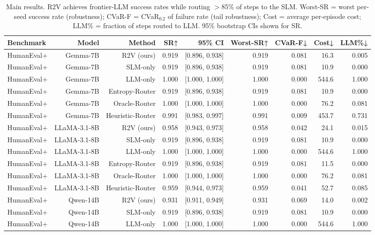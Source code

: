 \begin{table}[t]
\centering
\caption{Main results.  R2V achieves frontier-LLM success rates while routing $>$85\% of steps to the SLM.  Worst-SR = worst per-seed success rate (robustness); CVaR-F = CVaR$_{0.2}$ of failure rate (tail robustness); Cost = average per-episode cost; LLM\% = fraction of steps routed to LLM. 95\% bootstrap CIs shown for SR.}
\label{tab:main-results}
\begin{tabular}{lrrrrrrrr}
\hline
Benchmark & Model & Method & SR↑ & 95\% CI & Worst-SR↑ & CVaR-F↓ & Cost↓ & LLM\%↓ \\
\hline
HumanEval+ & Gemma-7B & R2V (ours) & 0.919 & [0.896, 0.938] & 0.919 & 0.081 & 16.3 & 0.005 \\
HumanEval+ & Gemma-7B & SLM-only & 0.919 & [0.896, 0.938] & 0.919 & 0.081 & 10.9 & 0.000 \\
HumanEval+ & Gemma-7B & LLM-only & 1.000 & [1.000, 1.000] & 1.000 & 0.000 & 544.6 & 1.000 \\
HumanEval+ & Gemma-7B & Entropy-Router & 0.919 & [0.896, 0.938] & 0.919 & 0.081 & 10.9 & 0.000 \\
HumanEval+ & Gemma-7B & Oracle-Router & 1.000 & [1.000, 1.000] & 1.000 & 0.000 & 76.2 & 0.081 \\
HumanEval+ & Gemma-7B & Heuristic-Router & 0.991 & [0.983, 0.997] & 0.991 & 0.009 & 453.7 & 0.731 \\
HumanEval+ & LLaMA-3.1-8B & R2V (ours) & 0.958 & [0.943, 0.973] & 0.958 & 0.042 & 24.1 & 0.015 \\
HumanEval+ & LLaMA-3.1-8B & SLM-only & 0.919 & [0.896, 0.938] & 0.919 & 0.081 & 10.9 & 0.000 \\
HumanEval+ & LLaMA-3.1-8B & LLM-only & 1.000 & [1.000, 1.000] & 1.000 & 0.000 & 544.6 & 1.000 \\
HumanEval+ & LLaMA-3.1-8B & Entropy-Router & 0.919 & [0.896, 0.938] & 0.919 & 0.081 & 11.5 & 0.000 \\
HumanEval+ & LLaMA-3.1-8B & Oracle-Router & 1.000 & [1.000, 1.000] & 1.000 & 0.000 & 76.2 & 0.081 \\
HumanEval+ & LLaMA-3.1-8B & Heuristic-Router & 0.959 & [0.944, 0.973] & 0.959 & 0.041 & 52.7 & 0.085 \\
HumanEval+ & Qwen-14B & R2V (ours) & 0.931 & [0.911, 0.949] & 0.931 & 0.069 & 14.0 & 0.002 \\
HumanEval+ & Qwen-14B & SLM-only & 0.919 & [0.896, 0.938] & 0.919 & 0.081 & 10.9 & 0.000 \\
HumanEval+ & Qwen-14B & LLM-only & 1.000 & [1.000, 1.000] & 1.000 & 0.000 & 544.6 & 1.000 \\

\end{tabular}
\end{table}
